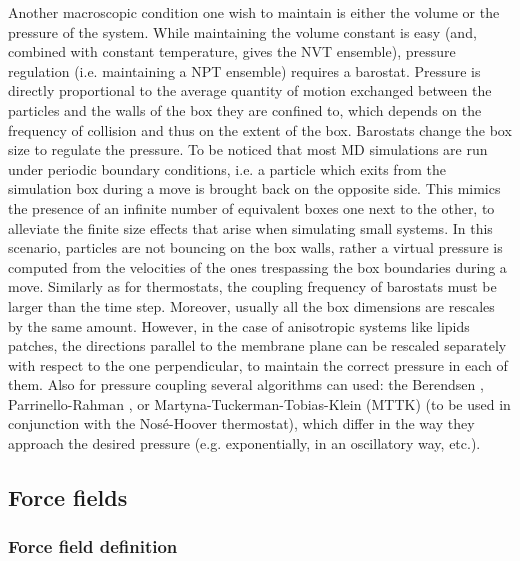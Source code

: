 Another macroscopic condition one wish to maintain is either the volume or the pressure of the system. While maintaining the volume constant is easy (and, combined with constant temperature, gives the NVT ensemble), pressure regulation (i.e. maintaining a NPT ensemble) requires a barostat.
%
Pressure is directly proportional to the average quantity of motion exchanged between the particles and the walls of the box they are confined to, which depends on the frequency of collision and thus on the extent of the box. Barostats change the box size to regulate the pressure.
%
To be noticed that most MD simulations are run under periodic boundary conditions, i.e. a particle which exits from the simulation box during a move is brought back on the opposite side. This mimics the presence of an infinite number of equivalent boxes one next to the other, to alleviate the finite size effects that arise when simulating small systems.
%
In this scenario, particles are not bouncing on the box walls, rather a virtual pressure is computed from the velocities of the ones trespassing the box boundaries during a move.
%
Similarly as for thermostats, the coupling frequency of barostats must be larger than the time step. Moreover, usually all the box dimensions are rescales by the same amount. However, in the case of anisotropic systems like lipids patches, the directions parallel to the membrane plane can be rescaled separately with respect to the one perpendicular, to maintain the correct pressure in each of them.
%
Also for pressure coupling several algorithms can used: the Berendsen \cite{Berendsen1984},
Parrinello-Rahman \cite{Parrinello1981},
or Martyna-Tuckerman-Tobias-Klein (MTTK) \cite{Martyna1996} (to be used in conjunction with the Nos\'{e}-Hoover thermostat), which differ in the way they approach the desired pressure (e.g. exponentially, in an oscillatory way, etc.).


\subsection{Force fields} 

\subsubsection{Force field definition} \label{sec:ff}

